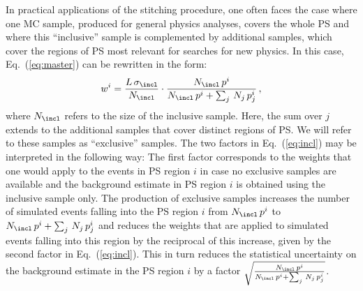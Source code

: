 In practical applications of the stitching procedure,
one often faces the case where one MC sample, produced for general physics analyses, covers the whole PS
and where this ``inclusive'' sample is complemented by additional samples, which cover the regions of PS most relevant for searches for new physics.
In this case, Eq.~(\ref{eq:master}) can be rewritten in the form:
\begin{equation}
w^{i} = \frac{L \, \sigma_{\incl}}{N_{\incl}} \cdot \frac{N_{\incl} \, p^{i}}{N_{\incl} \, p^{i} + \sum_{j} \, N_{j} \, p_{j}^{i}} \, ,
\label{eq:incl}
\end{equation}
where $N_{\incl}$ refers to the size of the inclusive sample.
Here, the sum over $j$ extends to the additional samples that cover distinct regions of PS.
We will refer to these samples as ``exclusive'' samples.
The two factors in Eq.~(\ref{eq:incl}) may be interpreted in the following way:
The first factor corresponds to the weights that one would apply to the events in PS region $i$ 
in case no exclusive samples are available and the background estimate in PS region $i$ is obtained using the inclusive sample only.
The production of exclusive samples increases the number of simulated events falling into the PS region $i$ 
from $N_{\incl} \, p^{i}$ to $N_{\incl} \, p^{i} + \sum_{j} \, N_{j} \, p_{j}^{i}$ 
and reduces the weights that are applied to simulated events falling into this region by the reciprocal of this increase,
given by the second factor in Eq.~(\ref{eq:incl}).
This in turn reduces the statistical uncertainty on the background estimate in the PS region $i$ by a factor 
$\sqrt{\frac{N_{\incl} \, p^{i}}{N_{\incl} \, p^{i} + \sum_{j} \, N_{j} \, p_{j}^{i}}}$.
